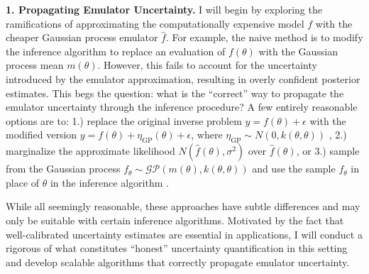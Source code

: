 \documentclass[12pt]{article}
\begin{document}
 \textbf{1. Propagating Emulator Uncertainty.} I will begin by exploring the ramifications of approximating the computationally expensive model $f$ with the  cheaper Gaussian process emulator $\hat{f}$. 
For example, the naive method is to modify the inference algorithm to replace an evaluation of $f(\theta)$ with the Gaussian process mean $m(\theta)$. However, this fails to account
 for the uncertainty introduced by the emulator approximation, resulting in overly confident posterior estimates. This begs the question: what is the ``correct'' way to propagate the emulator uncertainty through 
 the inference procedure? A few entirely reasonable options are to: 1.) replace the original inverse problem $y = f(\theta) + \epsilon$ with the modified version $y = f(\theta) + \eta_{\text{GP}}(\theta) + \epsilon$, 
 where $\eta_{\text{GP}} \sim N(0, k(\theta, \theta))$ \cite{Cleary}, 2.) marginalize the approximate likelihood $N(\hat{f}(\theta), \sigma^2)$ over $\hat{f}(\theta)$, or 3.) sample from the Gaussian process 
 $f_\theta \sim \mathcal{GP}(m(\theta), k(\theta, \theta))$ and use the sample $f_\theta$ in place of $\theta$ in the inference algorithm \cite{Fer}. 
 
While all seemingly reasonable, these approaches have subtle differences and may only be suitable with certain inference algorithms. Motivated by the fact that well-calibrated uncertainty estimates are essential in applications, I will conduct a rigorous of what constitutes ``honest'' uncertainty quantification in this setting and develop scalable algorithms that correctly propagate emulator uncertainty. 
 
\end{document}
